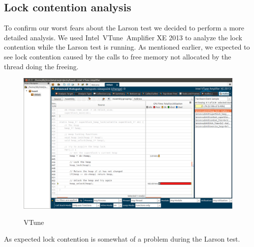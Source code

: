 \documentclass[oneside]{amsart}
\theoremstyle{definition}
\theoremstyle{remark}
\numberwithin{equation}{section}
\begin{document}
\subsection{Lock contention analysis}
To confirm our worst fears about the Larson test we decided to perform a more detailed analysis. We used Intel\textregistered\ VTune\texttrademark\  Amplifier XE 2013 to analyze the lock contention while the Larson test is running. As mentioned earlier, we expected to see lock contention caused by the calls to free memory not allocated by the thread doing the freeing.
\begin{figure}[h]
    \caption{VTune}
    \centering
    \includegraphics[scale=0.28]{VTune.png}
    \label{fig:plot}
\end{figure}

As expected lock contention is somewhat of a problem during the Larson test.

\end{document}
